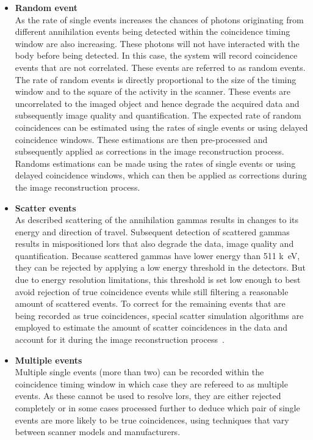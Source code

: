 \begin{itemize}
\item\textbf{Random event}\\
As the rate of single events increases the chances of photons originating from different annihilation events being detected within the coincidence timing window are also increasing. These photons will not have interacted with the body before being detected.
In this case, the system will record coincidence events that are not correlated. These events are referred to as random events. 
The rate of random events is directly proportional to the size of the timing window and to the square of the activity in the scanner. These events are uncorrelated to the imaged object and hence degrade the acquired data and subsequently image quality and quantification.  
The expected rate of random coincidences can be estimated using the rates of single events or using delayed coincidence windows. These estimations are then pre-processed and subsequently applied as corrections in the image reconstruction process. 
Randoms estimations can be made using the rates of single events or using delayed coincidence windows, which can then be applied as corrections during the image reconstruction process. 
%
%
\item\textbf{Scatter events}\\
As described scattering of the annihilation gammas results in changes to its energy and direction of travel. Subsequent detection of scattered gammas results in mispositioned \glspl{lor} that also degrade the data, image quality and quantification. 
Because scattered gammas have lower energy than 511 \si{k\electronvolt}, they can be rejected by applying a low energy threshold in the detectors. But due to energy resolution limitations, this threshold is set low enough to best avoid rejection of true coincidence events while still filtering a reasonable amount of scattered events.
To correct for the remaining events that are being recorded as true coincidences, special scatter simulation algorithms are employed to estimate the amount of scatter coincidences in the data and account for it during the image reconstruction process~\cite{Watson1996,Polycarpou2011}.
%
\item\textbf{Multiple events}\\
Multiple single events (more than two) can be recorded within the coincidence timing window in which case they are refereed to as multiple events. As these cannot be used to resolve \glspl{lor}, they are either rejected completely or in some cases processed further to deduce which pair of single events are more likely to be true coincidences, using techniques that vary between scanner models and manufacturers. 

\end{itemize}
